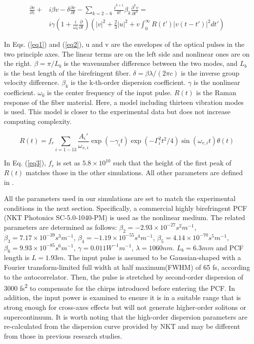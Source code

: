 \documentclass{osa-article}
\begin{document}
\begin{equation}
\begin{split}
\frac{\partial v}{\partial z} + & i\beta v - \delta \frac{\partial v}{\partial t}-\sum_{k=2-6}\frac{i^{k+1}}{k!}\beta_k\frac{\partial^k v}{\partial t^k} =\\
 & i\gamma\left(1+\frac{i}{\omega_0}\frac{\partial}{\partial t}\right)\left(|v|^2+\frac{2}{3}|u|^2+v\int_0^\infty{R(t')|v(t-t')|^2dt'} \right)
\label{eq2}
\end{split}
\end{equation}

In Eqs. (\ref{eq1}) and (\ref{eq2}), u and v are the envelopes of the optical pulses in the two principle axes. The linear terms are on the left side and nonlinear ones are on the right. $\beta=\pi/L_b$ is the wavenumber difference between the two modes, and $L_b$ is the beat length of the birefringent fiber. $\delta=\beta \lambda/(2\pi c)$ is the inverse group velocity difference. $\beta_k$ is the k-th-order dispersion coefficient. $\gamma$ is the nonlinear coefficient. $\omega_0$ is the center frequency of the input pulse. $R(t)$ is the Raman response of the fiber material. Here, a model including thirteen vibration modes is used\cite{Hollenbeck2002}. This model is closer to the experimental data but does not increase computing complexity.

\begin{equation}
    R(t)=f_r\sum_{i=1-13}\frac{A_i '}{\omega_{v,i}}\exp(-\gamma_i t)\exp(-\Gamma_i^2t^2/4)\sin(\omega_{v,i}t)\theta(t)
    \label{eq3}
\end{equation}

In Eq. (\ref{eq3}), $f_r$ is set as $5.8\times 10^{10}$ such that the height of the first peak of $R(t)$ matches those in the other simulations\cite{agrawal_nonlinear_2013}. All other parameters are defined in \cite{Hollenbeck2002}.

All the parameters used in our simulations are set to match the experimental conditions in the next section. Specifically, a commercial highly birefringent PCF (NKT Photonics SC-5.0-1040-PM) is used as the nonlinear medium. The related parameters are determined as follows: $\beta_2=-2.93\times 10^{-27} s^2m^{-1}$, $\beta_3=7.17\times 10^{-39} s^3m^{-1}$, $\beta_4=-1.19\times 10^{-55} s^4m^{-1}$, $\beta_5=4.14\times 10^{-70} s^5m^{-1}$, $\beta_6=9.93\times 10^{-85} s^6m^{-1}$, $\gamma=0.011 W^{-1}m^{-1}$, $\lambda=1060 nm$. $L_b=6.3 mm$ and PCF length is $ L=1.93m$. The input pulse is assumed to be Gaussian-shaped with a Fourier transform-limited full width at half maximum(FWHM) of 65 fs, according to the autocorrelator. Then, the pulse is stretched by second-order dispersion of 3000 fs\textsuperscript{2} to compensate for the chirps introduced before entering the PCF. In addition, the input power is examined to ensure it is in a suitable range that is strong enough for cross-axes effects but will not generate higher-order solitons or supercontinuum. It is worth noting that the high-order dispersion parameters are re-calculated from the dispersion curve provided by NKT and may be different from those in previous research studies\cite{chen_dual-soliton_2016}.
\end{document}

